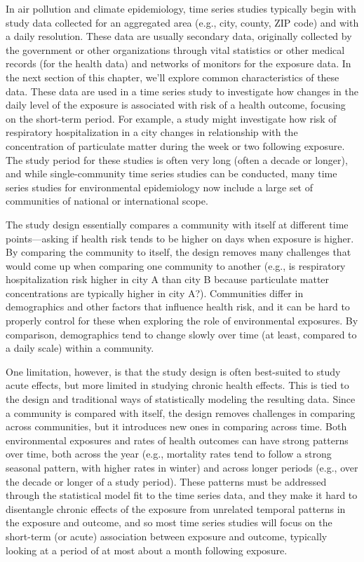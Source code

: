 \documentclass[
]{book}
\begin{document}
In air pollution and climate epidemiology, time series studies typically begin
with study data collected for an aggregated area (e.g., city, county, ZIP code)
and with a daily resolution. These data are usually secondary data, originally
collected by the government or other organizations through vital statistics
or other medical records (for the health data) and networks of monitors for
the exposure data. In the next section of this chapter, we'll explore common
characteristics of these data. These data are used in a time series study to
investigate how changes in the daily level of the exposure is associated with
risk of a health outcome, focusing on the short-term period. For example, a
study might investigate how risk of respiratory hospitalization in a city
changes in relationship with the concentration of particulate matter during the
week or two following exposure. The study period for these studies is often
very long (often a decade or longer), and while single-community time series
studies can be conducted, many time series studies for environmental epidemiology
now include a large set of communities of national or international scope.

The study design essentially compares a community with itself at different time
points---asking if health risk tends to be higher on days when exposure is higher.
By comparing the community to itself, the design removes many challenges that would
come up when comparing one community to another (e.g., is respiratory hospitalization
risk higher in city A than city B because particulate matter concentrations are
typically higher in city A?). Communities differ in demographics and other factors
that influence health risk, and it can be hard to properly control for these when
exploring the role of environmental exposures. By comparison, demographics tend to
change slowly over time (at least, compared to a daily scale) within a community.

One limitation, however, is that the study design is often best-suited to study
acute effects, but more limited in studying chronic health effects. This is tied
to the design and traditional ways of statistically modeling the resulting
data. Since a community is compared with itself, the design removes challenges in
comparing across communities, but it introduces new ones in comparing across time.
Both environmental exposures and rates of health outcomes can have strong
patterns over time, both across the year (e.g., mortality rates tend to follow
a strong seasonal pattern, with higher rates in winter) and across longer periods
(e.g., over the decade or longer of a study period). These patterns must be
addressed through the statistical model fit to the time series data, and they
make it hard to disentangle chronic effects of the exposure from unrelated
temporal patterns in the exposure and outcome, and so most time series studies
will focus on the short-term (or acute) association between exposure and outcome,
typically looking at a period of at most about a month following exposure.
\end{document}
